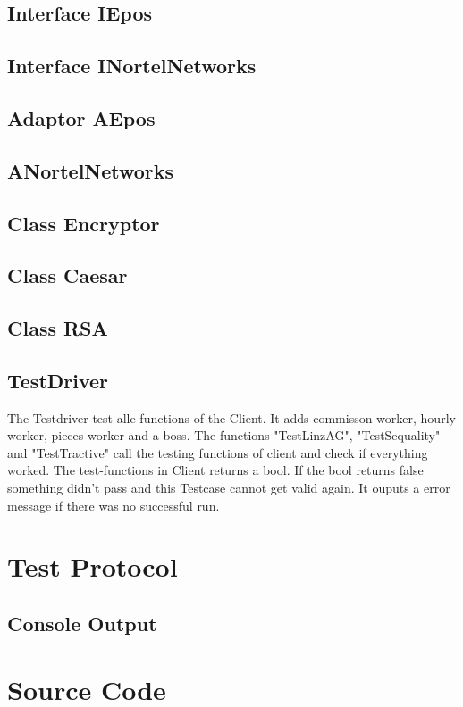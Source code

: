 \subsection{Interface IEpos}
\subsection{Interface INortelNetworks}
\subsection{Adaptor AEpos}
\subsection{ANortelNetworks}

\subsection{Class Encryptor}
\subsection{Class Caesar}
\subsection{Class RSA}

\subsection{TestDriver}
The Testdriver test alle functions of the Client. It adds commisson worker, hourly worker, pieces worker and a boss.
The functions "TestLinzAG", "TestSequality" and "TestTractive" call the testing functions of client and check if everything worked.
The test-functions in Client returns a bool. If the bool returns false something didn't pass and this Testcase cannot get valid again.
It ouputs a error message if there was no successful run.

\newpage
\section{Test Protocol}


\subsection{Console Output}


\section{Source Code}


